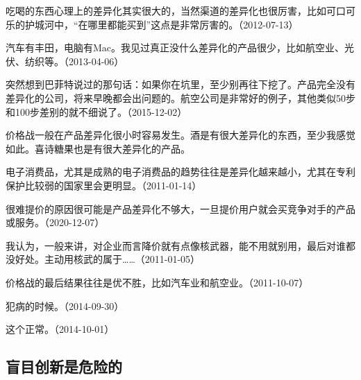 吃喝的东西心理上的差异化其实很大的，当然渠道的差异化也很厉害，比如可口可乐的护城河中，“在哪里都能买到”这点是非常厉害的。（2012-07-13）


汽车有丰田，电脑有Mac。我见过真正没什么差异化的产品很少，比如航空业、光伏、纺织等。（2013-04-06）

突然想到巴菲特说过的那句话：如果你在坑里，至少别再往下挖了。产品完全没有差异化的公司，将来早晚都会出问题的。航空公司是非常好的例子，其他类似50步和100步差别的就不细说了。（2015-12-02）


价格战一般在产品差异化很小时容易发生。酒是有很大差异化的东西，至少我感觉如此。喜诗糖果也是有很大差异化的产品。

电子消费品，尤其是成熟的电子消费品的趋势往往是差异化越来越小，尤其在专利保护比较弱的国家里会更明显。（2011-01-14）


很难提价的原因很可能是产品差异化不够大，一旦提价用户就会买竞争对手的产品或服务。（2020-12-07）


我认为，一般来讲，对企业而言降价就有点像核武器，能不用就别用，最后对谁都没好处。主动用核武的属于……（2011-01-05）


价格战的最后结果往往是优不胜，比如汽车业和航空业。（2011-10-07）


犯病的时候。（2014-09-30）


这个正常。（2014-10-01）

\subsection{盲目创新是危险的}

